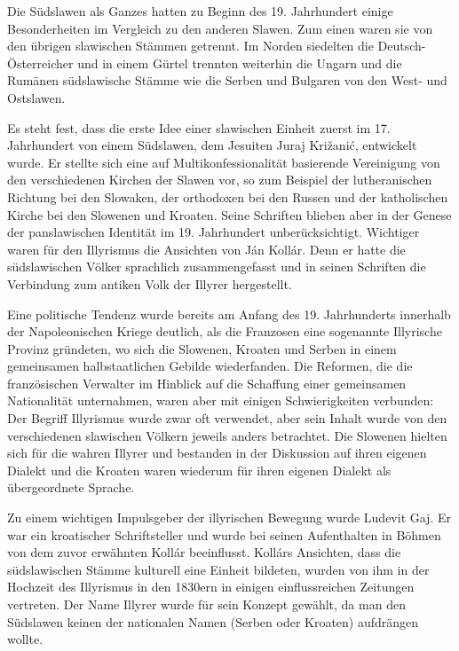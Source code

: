 \documentclass{../../sem_paper}
\begin{document}
Die Südslawen als Ganzes hatten zu Beginn des 19. Jahrhundert einige Besonderheiten im
Vergleich zu den anderen Slawen. Zum einen waren sie von den übrigen slawischen Stämmen
getrennt. Im Norden siedelten die Deutsch-Österreicher und in einem Gürtel trennten
weiterhin die Ungarn und die Rumänen südslawische Stämme wie die Serben und Bulgaren
von den West- und Ostslawen.

Es steht fest, dass die erste Idee einer slawischen Einheit zuerst im 17. Jahrhundert von einem
Südslawen, dem Jesuiten Juraj Križanić, entwickelt wurde. Er stellte sich eine auf
Multikonfessionalität basierende Vereinigung von den verschiedenen Kirchen der Slawen vor,
so zum Beispiel der lutheranischen Richtung bei den Slowaken, der orthodoxen bei den
Russen und der katholischen Kirche bei den Slowenen und Kroaten.\autocite[232]{nicoll}
Seine Schriften blieben aber in der Genese der panslawischen Identität im 19. Jahrhundert
unberücksichtigt. Wichtiger waren für den Illyrismus die Ansichten von Ján Kollár. Denn er
hatte die südslawischen Völker sprachlich zusammengefasst und in seinen Schriften die
Verbindung zum antiken Volk der Illyrer hergestellt.\autocite[65]{shidak}

Eine politische Tendenz wurde bereits am Anfang des 19. Jahrhunderts innerhalb der
Napoleonischen Kriege deutlich, als die Franzosen eine sogenannte Illyrische Provinz
gründeten, wo sich die Slowenen, Kroaten und Serben in einem gemeinsamen halbstaatlichen
Gebilde wiederfanden. Die Reformen, die die französischen Verwalter im Hinblick auf die
Schaffung einer gemeinsamen Nationalität unternahmen, waren aber mit einigen
Schwierigkeiten verbunden: Der Begriff Illyrismus wurde zwar oft verwendet, aber sein
Inhalt wurde von den verschiedenen slawischen Völkern jeweils anders betrachtet. Die
Slowenen hielten sich für die wahren Illyrer und bestanden in der Diskussion auf ihren
eigenen Dialekt und die Kroaten waren wiederum für ihren eigenen Dialekt als übergeordnete
Sprache.\autocite[62]{kohn}

Zu einem wichtigen Impulsgeber der illyrischen Bewegung wurde Ludevit Gaj. Er war ein
kroatischer Schriftsteller und wurde bei seinen Aufenthalten in Böhmen von dem zuvor
erwähnten Kollár beeinflusst. Kollárs Ansichten, dass die südslawischen Stämme kulturell
eine Einheit bildeten, wurden von ihm in der Hochzeit des Illyrismus in den 1830ern in
einigen einflussreichen Zeitungen vertreten. Der Name Illyrer wurde für sein Konzept
gewählt, da man den Südslawen keinen der nationalen Namen (Serben oder Kroaten)
aufdrängen wollte.\autocite[75]{shidak}
\end{document}
